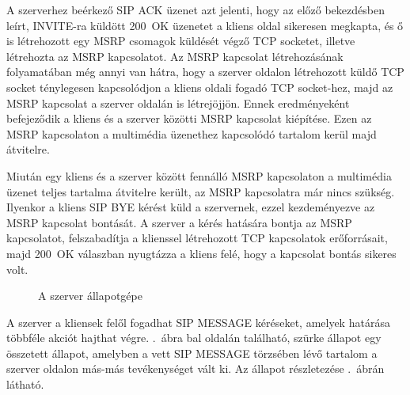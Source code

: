 A szerverhez beérkező SIP ACK üzenet azt jelenti, hogy az előző bekezdésben leírt, INVITE-ra küldött 200~OK üzenetet a kliens oldal sikeresen megkapta, és ő is létrehozott egy MSRP csomagok küldését végző TCP socketet, illetve létrehozta az MSRP kapcsolatot. Az MSRP kapcsolat létrehozásának folyamatában még annyi van hátra, hogy a szerver oldalon létrehozott küldő TCP socket ténylegesen kapcsolódjon a kliens oldali fogadó TCP socket-hez, majd az MSRP kapcsolat a szerver oldalán is létrejöjjön. Ennek eredményeként befejeződik a kliens és a szerver közötti MSRP kapcsolat kiépítése. Ezen az MSRP kapcsolaton a multimédia üzenethez kapcsolódó tartalom kerül majd átvitelre.

Miután egy kliens és a szerver között fennálló MSRP kapcsolaton a multimédia üzenet teljes tartalma átvitelre került, az MSRP kapcsolatra már nincs szükség. Ilyenkor a kliens SIP BYE kérést küld a szervernek, ezzel kezdeményezve az MSRP kapcsolat bontását. A szerver a kérés hatására bontja az MSRP  kapcsolatot, felszabadítja a klienssel létrehozott TCP kapcsolatok erőforrásait, majd 200~OK válaszban nyugtázza a kliens felé, hogy a kapcsolat bontás sikeres volt.

\begin{figure}[htbp]
\center
{}
\caption{A szerver állapotgépe}
\label{fig:server_statemachine_full}
\end{figure}

A szerver a kliensek felől fogadhat SIP MESSAGE kéréseket, amelyek határása többféle akciót hajthat végre. .~ábra bal oldalán található, szürke állapot egy összetett állapot, amelyben a vett SIP MESSAGE törzsében lévő tartalom a szerver oldalon más-más tevékenységet vált ki. Az állapot részletezése .~ábrán látható.

